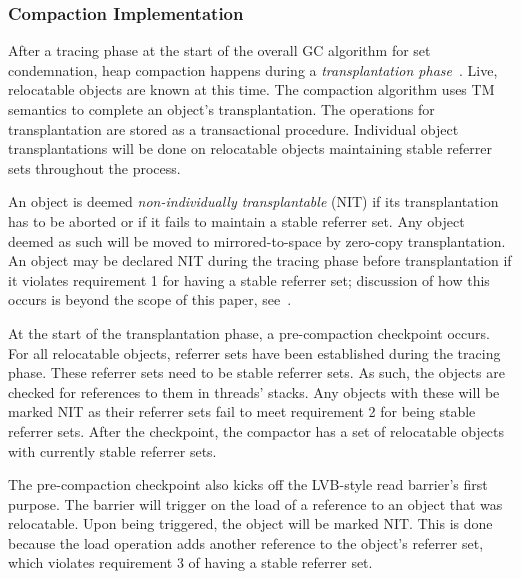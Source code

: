 \documentclass{sig-alternate}
\begin{document}
\subsubsection{Compaction Implementation}
\label{sec:collieAlgorithmImplementation}

After a tracing phase at the start of the overall GC algorithm for set condemnation, heap compaction
happens during a \emph{transplantation phase}~\cite{Iyengar:Collie}.
Live, relocatable objects are known at this time. The compaction 
algorithm uses TM semantics to complete an object's
transplantation. The operations for transplantation are stored as a
transactional procedure. Individual object transplantations will be done on relocatable objects 
maintaining stable referrer sets throughout the process.

An object is deemed \emph{non-individually transplantable} (NIT) if its transplantation
has to be aborted or if it fails to maintain a stable referrer set. 
Any object deemed as such will be moved to mirrored-to-space by zero-copy 
transplantation. An object may be declared NIT during the tracing phase before transplantation
if it violates requirement 1 for having a stable referrer set; discussion
of how this occurs is beyond the scope of this paper, see~\cite{Iyengar:Collie}.

At the start of the transplantation phase, a pre-compaction checkpoint occurs.
For all relocatable objects, referrer sets have been established during the tracing phase.
These referrer sets need to be stable referrer sets. As such, the objects are checked for 
references to them in threads' stacks. Any objects with these will be 
marked NIT as their referrer sets fail to meet requirement 2 for being stable referrer sets.
After the checkpoint, the compactor has a set of relocatable objects with currently stable referrer sets.

The pre-compaction checkpoint also kicks off the LVB-style read barrier's first purpose. 
The barrier will trigger on the load of a reference to an object that was 
relocatable. Upon being triggered, the object will be marked NIT. This is done because
the load operation adds another reference to the object's referrer set, which violates
requirement 3 of having a stable referrer set.
\end{document}

